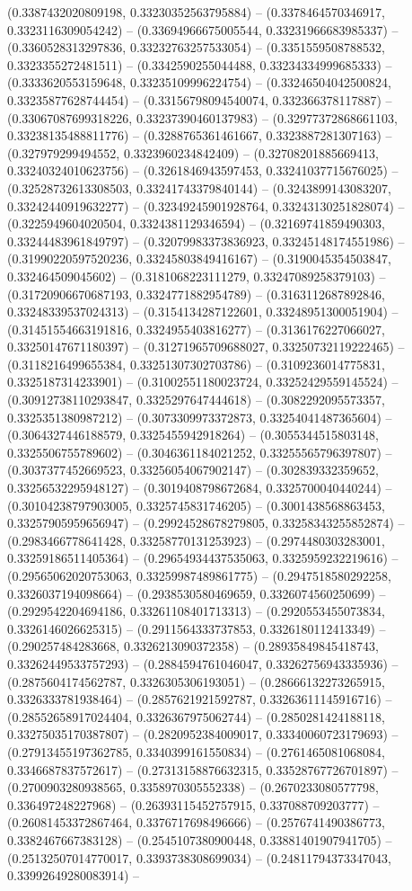 (0.3387432020809198, 0.33230352563795884) -- (0.3378464570346917, 0.3323116309054242) -- (0.33694966675005544, 0.33231966683985337) -- (0.3360528313297836, 0.33232763257533054) -- (0.3351559508788532, 0.3323355272481511) -- (0.3342590255044488, 0.33234334999685333) -- (0.3333620553159648, 0.33235109996224754) -- (0.33246504042500824, 0.33235877628744454) -- (0.33156798094540074, 0.332366378117887) -- (0.33067087699318226, 0.33237390460137983) -- (0.32977372868661103, 0.33238135488811776) -- (0.3288765361461667, 0.3323887281307163) -- (0.327979299494552, 0.3323960234842409) -- (0.32708201885669413, 0.33240324010623756) -- (0.3261846943597453, 0.33241037715676025) -- (0.32528732613308503, 0.33241743379840144) -- (0.3243899143083207, 0.33242440919632277) -- (0.32349245901928764, 0.33243130251828074) -- (0.3225949604020504, 0.3324381129346594) -- (0.32169741859490303, 0.33244483961849797) -- (0.32079983373836923, 0.33245148174551986) -- (0.31990220597520236, 0.33245803849416167) -- (0.3190045354503847, 0.332464509045602) -- (0.3181068223111279, 0.33247089258379103) -- (0.31720906670687193, 0.3324771882954789) -- (0.3163112687892846, 0.33248339537024313) -- (0.3154134287122601, 0.33248951300051904) -- (0.31451554663191816, 0.3324955403816277) -- (0.3136176227066027, 0.33250147671180397) -- (0.31271965709688027, 0.33250732119222465) -- (0.3118216499655384, 0.33251307302703786) -- (0.3109236014775831, 0.3325187314233901) -- (0.31002551180023724, 0.33252429559145524) -- (0.30912738110293847, 0.3325297647444618) -- (0.3082292095573357, 0.3325351380987212) -- (0.3073309973372873, 0.33254041487365604) -- (0.3064327446188579, 0.3325455942918264) -- (0.3055344515803148, 0.3325506755789602) -- (0.3046361184021252, 0.33255565796397807) -- (0.3037377452669523, 0.33256054067902147) -- (0.302839332359652, 0.33256532295948127) -- (0.3019408798672684, 0.3325700040440244) -- (0.30104238797903005, 0.3325745831746205) -- (0.3001438568863453, 0.33257905959656947) -- (0.29924528678279805, 0.33258343255852874) -- (0.2983466778641428, 0.33258770131253923) -- (0.2974480303283001, 0.33259186511405364) -- (0.29654934437535063, 0.3325959232219616) -- (0.29565062020753063, 0.33259987489861775) -- (0.2947518580292258, 0.3326037194098664) -- (0.2938530580469659, 0.3326074560250699) -- (0.2929542204694186, 0.33261108401713313) -- (0.2920553455073834, 0.3326146026625315) -- (0.2911564333737853, 0.3326180112413349) -- (0.290257484283668, 0.3326213090372358) -- (0.28935849845418743, 0.33262449533757293) -- (0.2884594761046047, 0.33262756943335936) -- (0.2875604174562787, 0.3326305306193051) -- (0.28666132273265915, 0.3326333781938464) -- (0.2857621921592787, 0.33263611145916716) -- (0.28552658917024404, 0.3326367975062744) -- (0.2850281424188118, 0.33275035170387807) -- (0.2820952384009017, 0.33340060723179693) -- (0.27913455197362785, 0.3340399161550834) -- (0.2761465081068084, 0.3346687837572617) -- (0.27313158876632315, 0.33528767726701897) -- (0.2700903280938565, 0.3358970305552338) -- (0.2670233080577798, 0.336497248227968) -- (0.26393115452757915, 0.337088709203777) -- (0.26081453372867464, 0.3376717698496666) -- (0.2576741490386773, 0.3382467667383128) -- (0.2545107380900448, 0.33881401907941705) -- (0.25132507014770017, 0.3393738308699034) -- (0.24811794373347043, 0.33992649280083914) -- 